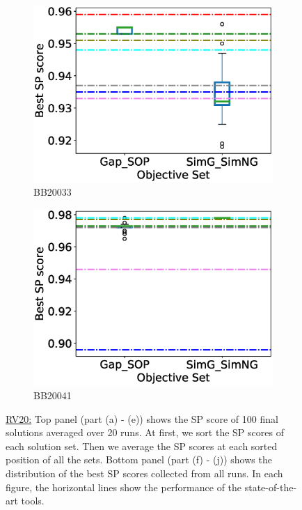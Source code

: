 \begin{figure}[!htbp]
\begin{adjustwidth}{-1cm}{-1cm}
\begin{subfigure}{0.22\textwidth}
			\includegraphics[width=\columnwidth]{Figure/summary/precomputedInit/Balibase/BB20033_objset_pairs_rank_2}
			\caption{BB20033}
		\end{subfigure}
		\begin{subfigure}{0.22\textwidth}
			\includegraphics[width=\columnwidth]{Figure/summary/precomputedInit/Balibase/BB20041_objset_pairs_rank_2}
			\caption{BB20041}
		\end{subfigure}
		\caption{\underline{RV20:} Top panel (part (a) - (e)) shows the SP score of 100 final solutions averaged over 20 runs. At first, we sort the SP scores of each solution set. Then we average the SP scores at each sorted position of all the sets. Bottom panel (part (f) - (j)) shows the distribution of the best SP scores collected from all runs. In each figure, the horizontal lines show the performance of the state-of-the-art tools.}
		\label{fig:rv20_sp}
	\end{adjustwidth}
\end{figure}


